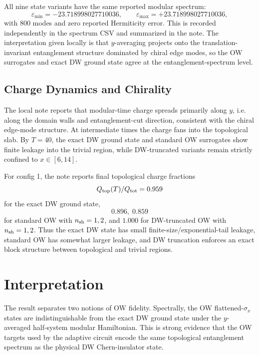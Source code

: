\documentclass[aps,prb,onecolumn,nofootinbib,superscriptaddress]{revtex4-2}
\begin{document}
All nine state variants have the same reported modular spectrum:
\begin{equation}
\varepsilon_{\min}=-23.718998027710036,\qquad
\varepsilon_{\max}=+23.718998027710036,
\end{equation}
with \(800\) modes and zero reported Hermiticity error.  This is recorded independently in the spectrum CSV and summarized in the note.  The interpretation given locally is that \(y\)-averaging projects onto the translation-invariant entanglement structure dominated by chiral edge modes, so the OW surrogates and exact DW ground state agree at the entanglement-spectrum level.

\subsection{Charge Dynamics and Chirality}

The local note reports that modular-time charge spreads primarily along \(y\), i.e. along the domain walls and entanglement-cut direction, consistent with the chiral edge-mode structure.  At intermediate times the charge fans into the topological slab.  By \(T=40\), the exact DW ground state and standard OW surrogates show finite leakage into the trivial region, while DW-truncated variants remain strictly confined to \(x\in[6,14]\).

For config 1, the note reports final topological charge fractions
\begin{equation}
Q_{\rm top}(T)/Q_{\rm tot}=0.959
\end{equation}
for the exact DW ground state,
\begin{equation}
0.896,\;0.859
\end{equation}
for standard OW with \(n_{\rm sh}=1,2\), and \(1.000\) for DW-truncated OW with \(n_{\rm sh}=1,2\).  Thus the exact DW state has small finite-size/exponential-tail leakage, standard OW has somewhat larger leakage, and DW truncation enforces an exact block structure between topological and trivial regions.

\section{Interpretation}

The result separates two notions of OW fidelity.  Spectrally, the OW flattened-\(\sigma_x\) states are indistinguishable from the exact DW ground state under the \(y\)-averaged half-system modular Hamiltonian.  This is strong evidence that the OW targets used by the adaptive circuit encode the same topological entanglement spectrum as the physical DW Chern-insulator state.
\end{document}
